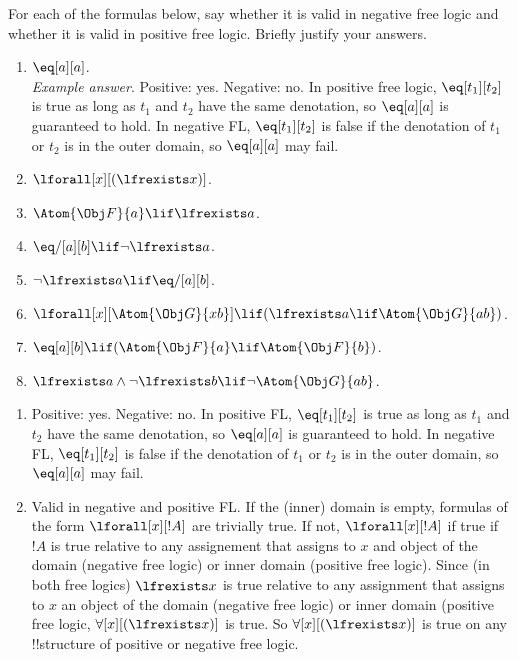 \documentclass[../../../include/open-logic-section]{subfiles}
\begin{document}
\begin{prob}
For each of the formulas below, say whether it is valid in negative
free logic and whether it is valid in positive free logic. Briefly
justify your answers.
\begin{enumerate}
\item $\eq[a][a]$.\\
\emph{Example answer}. Positive: yes. Negative: no. In positive free
logic, $\eq[t_{1}][t_{2}]$ is true as long as $t_{1}$ and $t_{2}$ have
the same denotation, so $\eq[a][a]$ is guaranteed to hold. In negative
FL, $\eq[t_{1}][t_{2}]$ is false if the denotation of $t_{1}$ or
$t_{2}$ is in the outer domain, so $\eq[a][a]$ may fail. 
\item $\lforall[x][(\lfrexists x)]$. 
\item $\Atom{\Obj F}{a} \lif \lfrexists a$.
\item $\eq/[a][b] \lif \lnot\lfrexists a$.
\item $\lnot\lfrexists a \lif \eq/[a][b]$.
\item $\lforall[x][\Atom{\Obj G}{xb}] \lif (\lfrexists a\lif \Atom{\Obj G}{ab})$.
\item $\eq[a][b]\lif(\Atom{\Obj F}{a}\lif \Atom{\Obj F}{b})$.
\item $\lfrexists a\land\lnot \lfrexists b\lif\lnot \Atom{\Obj G}{ab}$.
\end{enumerate}
\begin{ans}
\begin{enumerate}
\item Positive: yes. Negative: no. In positive FL, $\eq[t_{1}][t_{2}]$
	is true as long as $t_{1}$ and $t_{2}$ have the same denotation,
	so $\eq[a][a]$ is guaranteed to hold. In negative FL,
	$\eq[t_{1}][t_{2}]$ is false if the denotation of $t_{1}$ or
	$t_{2}$ is in the outer domain, so $\eq[a][a]$ may fail. 
\item Valid in negative and positive FL. If the (inner) domain is
	empty, formulas of the form $\lforall[x][!A]$ are trivially true.
	If not, $\lforall[x][!A]$ if true if $!A$ is true relative to any
	assignement that assigns to $x$ and object of the domain (negative
	free logic) or inner domain (positive free logic). Since (in both
	free logics) $\lfrexists x$ is true relative to any assignment
	that assigns to $x$ an object of the domain (negative free logic)
	or inner domain (positive free logic, $\forall[x][(\lfrexists x)]$
	is true. So $\forall[x][(\lfrexists x)]$ is true on any
	!!{structure} of positive or negative free logic. 

\end{enumerate}
\end{ans}
\end{prob}
\end{document}
